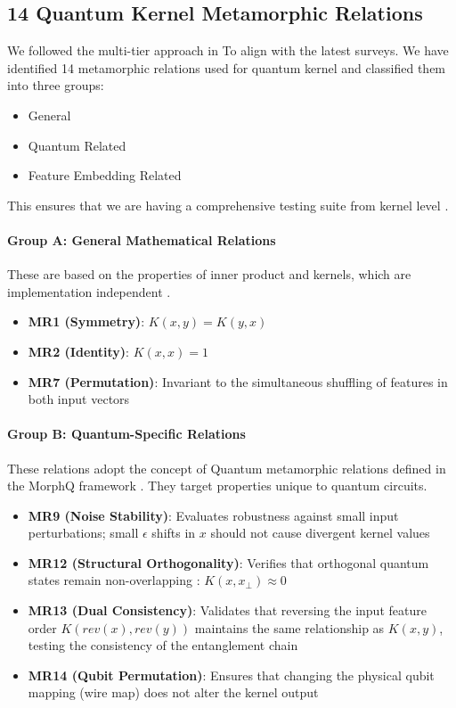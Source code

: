 \documentclass[12pt,a4paper]{article}
\begin{document}
	\subsection{14 Quantum Kernel Metamorphic Relations}
	
	We followed the multi-tier approach in \cite{paltenghi2024surveytestinganalysisquantum}To align with the latest surveys. We have identified 14 metamorphic relations used for quantum kernel and classified them into three groups:
	
	\begin{itemize}
		\item General
		\item Quantum Related
		\item Feature Embedding Related
	\end{itemize}
	
	This ensures that we are having a comprehensive testing suite from kernel level \cite{zaman2025surveyquantummachinelearning}.
	
	 \paragraph{Group A: General Mathematical Relations}
	These are based on the properties of inner product and kernels, which are implementation independent \cite{schuld2019}.
	\begin{itemize}
		\item \textbf{MR1 (Symmetry)}: $K(x,y) = K(y,x)$ 
		\item \textbf{MR2 (Identity)}: $K(x,x) = 1$
		\item \textbf{MR7 (Permutation)}: Invariant to the simultaneous shuffling of features in both input vectors \cite{xie2011}
	\end{itemize}
	
	\paragraph{Group B: Quantum-Specific Relations}
	These relations adopt the concept of Quantum metamorphic relations defined in the MorphQ framework \cite{Paltenghi2023}. They target properties unique to quantum circuits.
	
	\begin{itemize}
		\item \textbf{MR9 (Noise Stability)}: Evaluates robustness against small input perturbations; small $\epsilon$ shifts in $x$ should not cause divergent kernel values
		\item \textbf{MR12 (Structural Orthogonality)}: Verifies that orthogonal quantum states remain non-overlapping \cite{schuld2019}: $K(x, x_{\perp}) \approx 0$
		\item \textbf{MR13 (Dual Consistency)}: Validates that reversing the input feature order $K(rev(x), rev(y))$ maintains the same relationship as $K(x, y)$, testing the consistency of the entanglement chain \cite{Paltenghi2023}
		\item \textbf{MR14 (Qubit Permutation)}: Ensures that changing the physical qubit mapping (wire map) does not alter the kernel output \cite{Paltenghi2023}
	\end{itemize}
	
\end{document}
